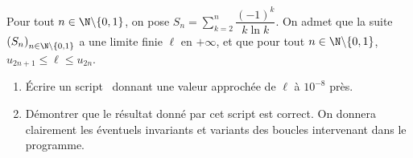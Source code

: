 Pour tout $n\in \N\backslash\{0,1\}$, on pose $S_n=\displaystyle\sum_{k=2}^n 
\dfrac{(-1)^k}{k\ln k}$. On admet que la suite $\left(S_n\right)_{n\in\N\backslash\{0,1\}}$ a 
une limite finie $\ell$ en $+\infty$, et que pour tout $n\in\N\backslash\{0,1\}$, $u_{2n+1}\leq \ell\leq u_{2n}$.

\begin{enumerate}
\item Écrire un script \python\ donnant une valeur approchée de $\ell$ à $10^{-8}$ près.
\item Démontrer que le résultat donné par cet script est correct. On donnera clairement les éventuels invariants et variants des boucles intervenant dans 
le programme.
\end{enumerate}